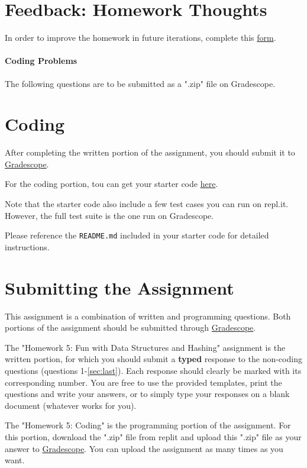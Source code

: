 \documentclass [12pt]{article}
\begin{document}



\pagebreak
\section{Feedback: Homework Thoughts }

In order to improve the homework in future iterations, complete this \href{https://forms.gle/LwMVLqf3FFuhJxVv7}{form}.




\begin{Instruction}

\paragraph{Coding Problems} The following questions are to be submitted as a ".zip" file on Gradescope. 

\end{Instruction}

\section{Coding }
After completing the written portion of the assignment, you should submit it to \href{https://www.gradescope.com/courses/350304}{Gradescope}.

For the coding portion, tou can get your starter code \href{https://replit.com/team/COMP285/HW5-Code}{here}.

Note that the starter code also include a few test cases you can run on repl.it. However, the full test suite is the one run on Gradescope.

Please reference the \texttt{README.md} included in your starter code for detailed instructions.

\section*{Submitting the Assignment}

This assignment is a combination of written and programming questions. Both portions of the assignment should be submitted through \href{https://www.gradescope.com/courses/350304}{Gradescope}.

The "Homework 5: Fun with Data Structures and Hashing" assignment is the written portion, for which you should submit a \textbf{typed} response to the non-coding questions (questions 1-\ref{sec:last}). Each response should clearly be marked with its corresponding number. You are free to use the provided templates, print the questions and write your answers, or to simply type your responses on a blank document (whatever works for you).

The "Homework 5: Coding" is the programming portion of the assignment. For this portion, download the ".zip" file from replit and upload this ".zip" file as your answer to \href{https://www.gradescope.com/courses/350304}{Gradescope}. You can upload the assignment as many times as you want.
\end{document}
